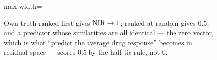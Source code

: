 \begin{figure}[htbp]
\begin{fullwidth}
\begin{adjustbox}{max width=\linewidth}
\begin{tikzpicture}
\end{tikzpicture}%
\end{adjustbox}
\caption[NIR is a discrimination score]{ Own truth ranked first gives $\textrm{NIR} \to 1$; ranked at random gives $0.5$; and a predictor whose
similarities are all identical --- the zero vector, which is what ``predict the average drug
response'' becomes in residual space --- scores $0.5$ by the half-tie rule, not $0$.}
\label{fig:nir}
\end{fullwidth}
\end{figure}
